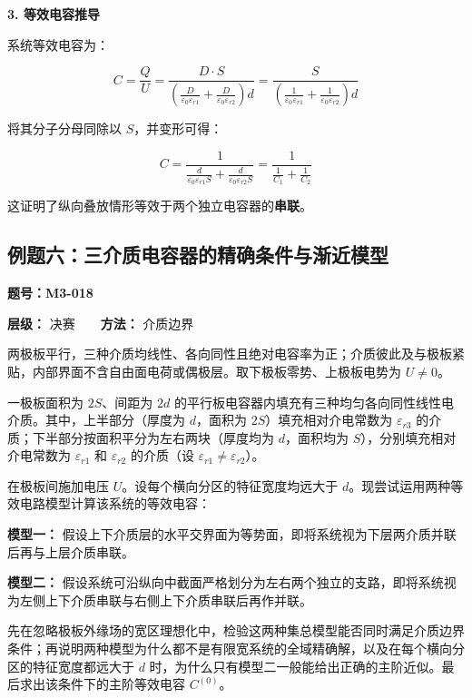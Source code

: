 \textbf{3. 等效电容推导}

系统等效电容为：

\[
C = \frac{Q}{U} = \frac{D \cdot S}{\left( \frac{D}{\varepsilon_0 \varepsilon_{r1}} + \frac{D}{\varepsilon_0 \varepsilon_{r2}} \right) d} = \frac{S}{\left( \frac{1}{\varepsilon_0 \varepsilon_{r1}} + \frac{1}{\varepsilon_0 \varepsilon_{r2}} \right) d}
\]

将其分子分母同除以 \(S\)，并变形可得：

\[
C = \frac{1}{\frac{d}{\varepsilon_0 \varepsilon_{r1} S} + \frac{d}{\varepsilon_0 \varepsilon_{r2} S}} = \frac{1}{\frac{1}{C_1} + \frac{1}{C_2}}
\]

这证明了纵向叠放情形等效于两个独立电容器的\textbf{串联}。

\subsection{例题六：三介质电容器的精确条件与渐近模型}\label{m3:ux4f8bux9898ux516dux4e09ux4ecbux8d28ux7535ux5bb9ux5668ux7684ux7cbeux786eux6761ux4ef6ux4e0eux6e10ux8fd1ux6a21ux578b}

\textbf{题号：M3-018}

\textbf{层级：} 决赛　　\textbf{方法：} 介质边界

两极板平行，三种介质均线性、各向同性且绝对电容率为正；介质彼此及与极板紧贴，内部界面不含自由面电荷或偶极层。取下极板零势、上极板电势为
\(U\ne0\)。

一极板面积为 \(2S\)、间距为 \(2d\)
的平行板电容器内填充有三种均匀各向同性线性电介质。其中，上半部分（厚度为
\(d\)，面积为 \(2S\)）填充相对介电常数为 \(\varepsilon_{r3}\)
的介质；下半部分按面积平分为左右两块（厚度均为 \(d\)，面积均为
\(S\)），分别填充相对介电常数为 \(\varepsilon_{r1}\) 和
\(\varepsilon_{r2}\) 的介质（设
\(\varepsilon_{r1} \neq \varepsilon_{r2}\)）。

在极板间施加电压 \(U\)。设每个横向分区的特征宽度均远大于
\(d\)。现尝试运用两种等效电路模型计算该系统的等效电容：

\textbf{模型一：}
假设上下介质层的水平交界面为等势面，即将系统视为下层两介质并联后再与上层介质串联。

\textbf{模型二：}
假设系统可沿纵向中截面严格划分为左右两个独立的支路，即将系统视为左侧上下介质串联与右侧上下介质串联后再作并联。

先在忽略极板外缘场的宽区理想化中，检验这两种集总模型能否同时满足介质边界条件；再说明两种模型为什么都不是有限宽系统的全域精确解，以及在每个横向分区的特征宽度都远大于
\(d\)
时，为什么只有模型二一般能给出正确的主阶近似。最后求出该条件下的主阶等效电容
\(C^{(0)}\)。


